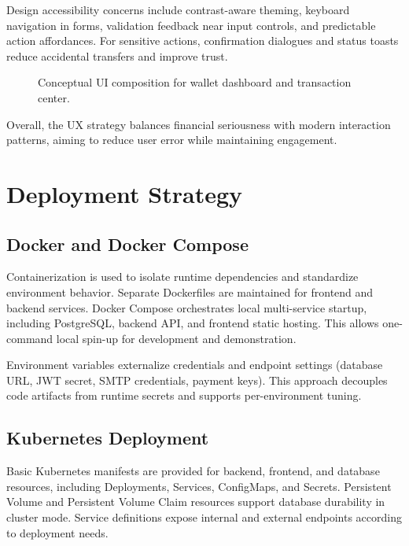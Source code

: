 \documentclass[conference]{IEEEtran}
\begin{document}
Design accessibility concerns include contrast-aware theming, keyboard navigation in forms, validation feedback near input controls, and predictable action affordances. For sensitive actions, confirmation dialogues and status toasts reduce accidental transfers and improve trust.

\begin{figure}[t]
\centering
{}
\caption{Conceptual UI composition for wallet dashboard and transaction center.}
\label{fig:ui_placeholder}
\end{figure}

Overall, the UX strategy balances financial seriousness with modern interaction patterns, aiming to reduce user error while maintaining engagement.

\section{Deployment Strategy}
\subsection{Docker and Docker Compose}
Containerization is used to isolate runtime dependencies and standardize environment behavior. Separate Dockerfiles are maintained for frontend and backend services. Docker Compose orchestrates local multi-service startup, including PostgreSQL, backend API, and frontend static hosting. This allows one-command local spin-up for development and demonstration.

Environment variables externalize credentials and endpoint settings (database URL, JWT secret, SMTP credentials, payment keys). This approach decouples code artifacts from runtime secrets and supports per-environment tuning.

\subsection{Kubernetes Deployment}
Basic Kubernetes manifests are provided for backend, frontend, and database resources, including Deployments, Services, ConfigMaps, and Secrets. Persistent Volume and Persistent Volume Claim resources support database durability in cluster mode. Service definitions expose internal and external endpoints according to deployment needs.
\end{document}
